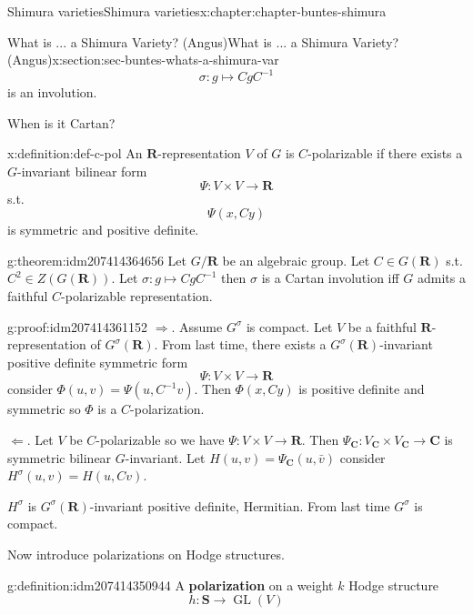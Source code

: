 \documentclass[oneside,10pt,]{book}
\newcommand{\terminology}[1]{\textbf{#1}}
\numberwithin{equation}{section}
\newcommand{\inv}{^{-1}}
\newcommand{\RR}{\mathbf{R}}
\newcommand{\CC}{\mathbf{C}}
\DeclareMathOperator{\GL}{GL}
\begin{document}
\begin{chapterptx}{Shimura varieties}{}{Shimura varieties}{}{}{x:chapter:chapter-buntes-shimura}
\begin{sectionptx}{What is ... a Shimura Variety? (Angus)}{}{What is ... a Shimura Variety? (Angus)}{}{}{x:section:sec-buntes-whats-a-shimura-var}
\begin{equation*}
\sigma \colon g \mapsto CgC\inv
\end{equation*}
is an involution.%
\par
When is it Cartan?%
\begin{definition}{}{x:definition:def-c-pol}%
An \(\RR\)-representation \(V\) of \(G\) is \(C\)-polarizable if there exists a \(G\)-invariant bilinear form%
\begin{equation*}
\Psi \colon V \times V \to \RR
\end{equation*}
s.t.%
\begin{equation*}
\Psi(x,Cy)
\end{equation*}
is symmetric and positive definite.%
\end{definition}
\begin{theorem}{}{}{g:theorem:idm207414364656}%
Let \(G/\RR\) be an algebraic group. Let \(C  \in G(\RR)\) s.t. \(C^2 \in Z(G(\RR))\). Let \(\sigma \colon g\mapsto Cg C\inv\)  then \(\sigma\) is a Cartan involution iff \(G\) admits a faithful \(C\)-polarizable representation.%
\end{theorem}
\begin{proofptx}{}{g:proof:idm207414361152}
\(\Rightarrow\). Assume \(G^\sigma \) is compact. Let \(V\) be a faithful \(\RR\)-representation of \(G^\sigma (\RR)\). From last time, there exists a \(G^\sigma(\RR)\)-invariant positive definite symmetric form%
\begin{equation*}
\Psi\colon V\times V\to \RR
\end{equation*}
consider \(\Phi(u,v) = \Psi(u, C\inv v)\). Then \(\Phi(x,Cy)\) is positive definite and symmetric so \(\Phi\) is a \(C\)-polarization.%
\par
\(\Leftarrow\). Let \(V\) be \(C\)-polarizable so we have \(\Psi \colon V\times V \to  \RR\). Then \(\Psi_\CC \colon V_\CC \times V_\CC \to \CC\) is symmetric bilinear \(G\)-invariant. Let \(H(u,v) = \Psi_\CC(u,\bar v)\) consider \(H^\sigma(u,v) = H(u,Cv)\).%
\par
\(H^\sigma\) is \(G^\sigma(\RR)\)-invariant positive definite, Hermitian. From last time \(G^\sigma\) is compact.%
\end{proofptx}
Now introduce polarizations on Hodge structures.%
\begin{definition}{}{g:definition:idm207414350944}%
A \terminology{polarization} on a weight \(k\) Hodge structure%
\begin{equation*}
h\colon \mathbf S \to \GL(V)
\end{equation*}
%
\begin{equation*}

\end{equation*}
\end{definition}
\end{sectionptx}
\end{chapterptx}
\end{document}
